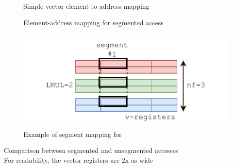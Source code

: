 \begin{turnipfig}
    \centering
    \begin{subfigure}[t]{\figinputWidth}
        \centering
        \caption{Simple vector element to address mapping}
        \label{fig:RVV_mem_unit_noseg}
    \end{subfigure}
    \hfill
    \begin{subfigure}[t]{\figinputWidth}
        \centering
        \caption{Element-address mapping for segmented access}
        \label{fig:RVV_mem_unit_3seg}
    \end{subfigure}
    
    \begin{subfigure}[t]{\figinputWidth}
        \centering
     \includegraphics[width=\textwidth]{Figures/RVV_mem_lmul_3seg.pdf}
        \caption{Example of segment mapping for }
        \label{fig:RVV_mem_lmul_3seg}
    \end{subfigure}
    \caption{Comparison between segmented and unsegmented accesses\\For readability, the vector registers are 2x as wide}
    \label{fig:RVV_mem_unit}
\end{turnipfig}
